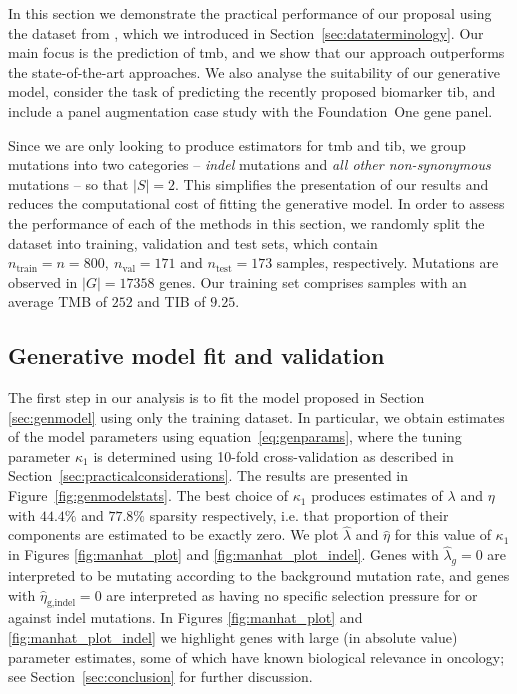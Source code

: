 \documentclass[../thesis.tex]{subfiles}
\begin{document}
In this section we demonstrate the practical performance of our proposal using the dataset from \citet{campbell_distinct_2016}, which we introduced in Section~\ref{sec:dataterminology}. Our main focus is the prediction of \gls{tmb}, and we show that our approach outperforms the state-of-the-art approaches. We also analyse the suitability of our generative model, consider the task of predicting the recently proposed biomarker \gls{tib}, and include a panel augmentation case study with the Foundation~One gene panel.

Since we are only looking to produce estimators for \gls{tmb} and \gls{tib}, we group mutations into two categories -- \emph{indel} mutations and \emph{all other non-synonymous} mutations -- so that $|S|=2$.  This simplifies the presentation of our results and reduces the computational cost of fitting the generative model.  In order to assess the performance of each of the methods in this section, we randomly split the dataset into training, validation and test sets, which contain $n_{\text{train}} = n = 800, \ n_{\text{val}} =  171$ and $n_{\text{test}} = 173$ samples, respectively.  Mutations are observed in $|G| = 17358$ genes. Our training set comprises samples with an average TMB of $252$ and TIB of $9.25$. 


\subsection{Generative model fit and validation \label{sec:genmodelfit}}



The first step in our analysis is to fit the model proposed in Section \ref{sec:genmodel} using only the training dataset. In particular, we obtain estimates of the model parameters using equation~\eqref{eq:genparams}, where the tuning parameter $\kappa_1$ is determined using 10-fold cross-validation as described in Section~\ref{sec:practicalconsiderations}.  The results are presented in Figure~\ref{fig:genmodelstats}. The best choice of $\kappa_1$ produces estimates of $\lambda$ and $\eta$ with $44.4 \%$ and $77.8 \%$ sparsity respectively, i.e. that proportion of their components are estimated to be exactly zero. We plot $\hat{\lambda}$ and $\hat{\eta}$ for this value of $\kappa_1$ in Figures \ref{fig:manhat_plot} and \ref{fig:manhat_plot_indel}. Genes with $\hat{\lambda}_g = 0$ are interpreted to be mutating according to the background mutation rate, and genes with $\hat{\eta}_{\text{g,indel}} = 0$ are interpreted as having no specific selection pressure for or against indel mutations. In Figures \ref{fig:manhat_plot} and \ref{fig:manhat_plot_indel} we highlight genes with large (in absolute value) parameter estimates, some of which have known biological relevance in oncology; see Section~\ref{sec:conclusion} for further discussion.   
\end{document}
